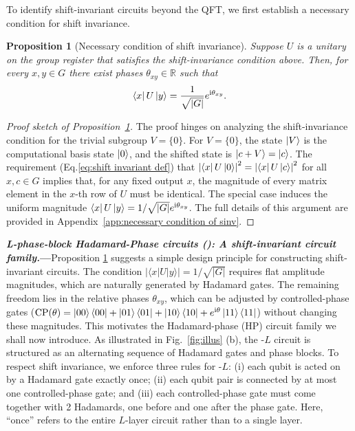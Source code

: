 \documentclass[reprint, aps, prl, superscriptaddress]{revtex4-2}
\renewcommand{\section}[1]{\par\medskip\noindent\textbf{{\textit{#1.}---}}}
\newcommand{\ii}{\mathrm{i}}
\newcommand{\myqc}{\text{HP}}
\newtheorem{proposition}{Proposition}
\begin{document}
To identify shift-invariant circuits beyond the QFT, we first establish a necessary condition for shift invariance.
\begin{proposition}[Necessary condition of shift invariance]
\label{thm:necessary_modulus_condition}
    Suppose $U$ is a unitary on the group register that satisfies the shift-invariance condition above. Then, for every $x,y\in G$ there exist phases $\theta_{xy}\in\mathbb{R}$ such that
    \begin{equation}
        \bra{x}U\ket{y}=\frac{1}{\sqrt{|G|}}e^{\ii\theta_{xy}}.
    \label{eq:necessarycondition}
    \end{equation}
    
\end{proposition}

\begin{proof}[Proof sketch of Proposition~\ref{thm:necessary_modulus_condition}]
The proof hinges on analyzing the shift-invariance condition for the trivial subgroup $V = \{0\}$. For $V = \{0\}$, the state $\ket{V}$ is the computational basis state $\ket{0}$, and the shifted state is $\ket{c+V} = \ket{c}$. The requirement (Eq.\eqref{eq:shift invariant def}) that $\left|\bra{x}U\ket{0}\right|^2 = \left|\bra{x}U\ket{c}\right|^2$ for all $x, c \in G$ implies that, for any fixed output $x$, the magnitude of every matrix element in the $x$-th row of $U$ must be identical. The special case induces the uniform magnitude $\bra{x}U\ket{y} = 1/\sqrt{|G|} e^{\ii \theta_{xy}}$. The full details of this argument are provided in Appendix~\ref{app:necessary condition of sinv}.
\end{proof}

\section{L-phase-block Hadamard-Phase circuits (\myqc): A shift-invariant circuit family}Proposition \ref{thm:necessary_modulus_condition} suggests a simple design principle for constructing shift-invariant circuits. The condition \(|\langle x|U|y\rangle|=1/\sqrt{|G|}\) requires flat amplitude magnitudes, which are naturally generated by Hadamard gates. The remaining freedom lies in the relative phases \(\theta_{xy}\), which can be adjusted by controlled-phase gates ($\mathrm{CP}(\theta)=\ket{00}\bra{00}+\ket{01}\bra{01}+\ket{10}\bra{10}+e^{\ii\theta}\ket{11}\bra{11}$) without changing these magnitudes. This motivates the Hadamard-phase (HP) circuit family we shall now introduce. As illustrated in Fig.~\ref{fig:illus} (b), the \myqc-$L$ circuit is structured as an alternating sequence of Hadamard gates and phase blocks. To respect shift invariance, we enforce three rules for \myqc-$L$: (i) each qubit is acted on by a Hadamard gate exactly once; (ii) each qubit pair is connected by at most one controlled-phase gate; and (iii) each controlled-phase gate must come together with 2 Hadamards, one before and one after the phase gate. Here, ``once'' refers to the entire $L$-layer circuit rather than to a single layer. 
\end{document}
